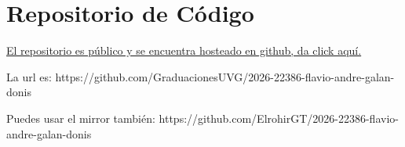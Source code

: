 \section{Repositorio de Código} \label{sec:repo}

\href{https://github.com/GraduacionesUVG/2026-22386-flavio-andre-galan-donis}{El repositorio es público y se encuentra hosteado en github, da click aquí.}

La url es: https://github.com/GraduacionesUVG/2026-22386-flavio-andre-galan-donis

Puedes usar el mirror también: https://github.com/ElrohirGT/2026-22386-flavio-andre-galan-donis
